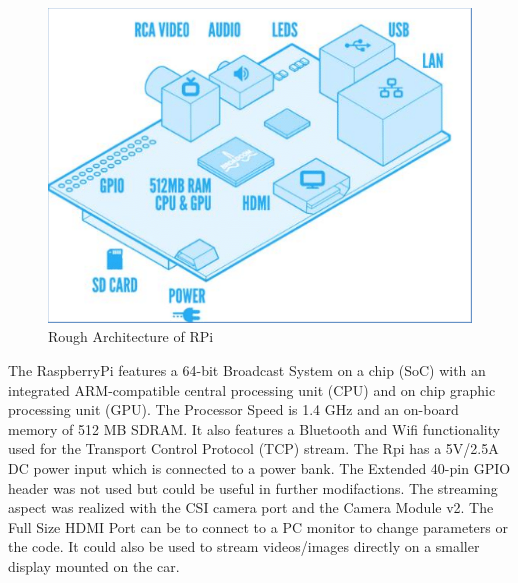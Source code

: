 \documentclass[conference]{IEEEtran}
\begin{document}
\begin{figure}[h!]
	\includegraphics[width=\linewidth]{RPiArchitecture.png}
	\caption{Rough Architecture of RPi}
	\label{fig:RPi}
\end{figure}
The RaspberryPi features a 64-bit Broadcast System on a chip (SoC) with an integrated ARM-compatible central processing unit (CPU) and on chip graphic processing unit (GPU). The Processor Speed is 1.4 GHz and an on-board memory of 512 MB SDRAM. It also features a Bluetooth and Wifi functionality used for the Transport Control Protocol (TCP) stream. The Rpi has a 5V/2.5A DC power input which is connected to a power bank. The Extended 40-pin GPIO header was not used but could be useful in further modifactions. The streaming aspect was realized with the CSI camera port and the Camera Module v2. The Full Size HDMI Port can be to connect to a PC monitor to change parameters or the code. It could also be used to stream videos/images directly on a smaller display mounted on the car. 
\end{document}
